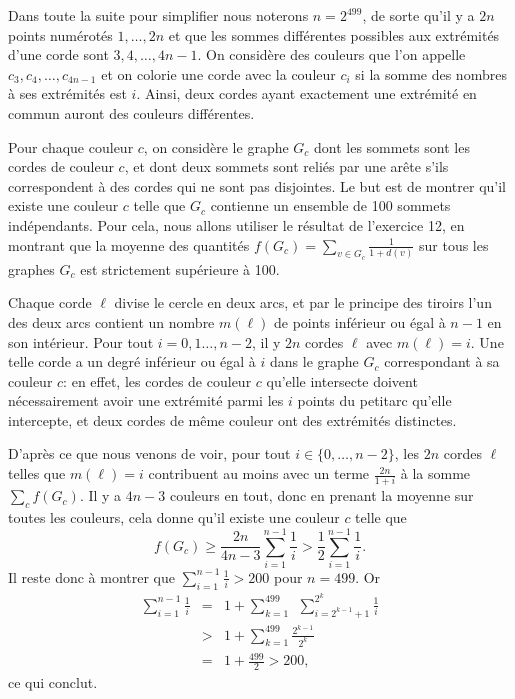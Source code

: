 \begin{sol} Dans toute la suite pour simplifier nous noterons $n = 2^{499}$, de sorte qu'il y a $2n$ points numérotés $1,\ldots,2n$ et que les sommes différentes possibles aux extrémités d'une corde sont $3,4,\ldots,4n-1$. On considère des couleurs que l'on appelle $c_3,c_4,\ldots,c_{4n-1}$ et on colorie une corde avec la couleur $c_i$ si la somme des nombres à ses extrémités est $i$. Ainsi, deux cordes ayant exactement une extrémité en commun auront des couleurs différentes.

Pour chaque couleur $c$, on considère le graphe $G_c$ dont les sommets sont les cordes de couleur $c$, et dont deux sommets sont reliés par une arête s'ils correspondent à des cordes qui ne sont pas disjointes. Le but est de montrer qu'il existe une couleur $c$ telle que $G_c$ contienne un ensemble de 100 sommets indépendants. Pour cela, nous allons utiliser le résultat de l'exercice 12, en montrant que la moyenne des quantités $f(G_c) = \sum_{v\in G_c}\frac{1}{1+d(v)}$ sur tous les graphes $G_c$ est strictement supérieure à 100.  

Chaque corde $\ell$ divise le cercle en deux arcs, et par le principe des tiroirs l'un des deux arcs contient un nombre $m(\ell)$ de points inférieur ou égal à $n-1$ en son intérieur. Pour tout $i = 0,1\ldots,n-2$, il y $2n$ cordes $\ell$ avec $m(\ell) = i$. Une telle corde a un degré inférieur ou égal à $i$ dans le graphe $G_c$ correspondant à sa couleur $c$: en effet, les cordes de couleur $c$ qu'elle intersecte doivent nécessairement avoir une extrémité parmi les $i$ points du \og petit\fg arc qu'elle intercepte, et deux cordes de même couleur ont des extrémités distinctes.

D'après ce que nous venons de voir, pour tout $i\in\{0,\ldots,n-2\}$, les $2n$ cordes $\ell$ telles que $m(\ell) = i$ contribuent au moins avec un terme $\frac{2n}{1+i}$ à la somme $\sum_{c}f(G_c)$. Il y a $4n-3$ couleurs en tout, donc en prenant la moyenne sur toutes les couleurs, cela donne qu'il existe une couleur $c$ telle que
$$f(G_c) \geq \frac{2n}{4n-3}\sum_{i=1}^{n-1} \frac{1}{i}>\frac12 \sum_{i=1}^{n-1} \frac{1}{i}.$$
Il reste donc à montrer que $\sum_{i=1}^{n-1} \frac{1}{i}>200$ pour $n=499$. Or
\begin{eqnarray*}\sum_{i=1}^{n-1} \frac{1}{i} &=& 1+ \sum_{k=1}^{499}\ \ \sum_{i={2^{k-1}+1}}^{2^k}\frac{1}{i}\\
                                              &>& 1+\sum_{k=1}^{499}\frac{2^{k-1}}{2^k}\\
                                              &=& 1 + \frac{499}{2} > 200,
\end{eqnarray*}
ce qui conclut. \end{sol}
